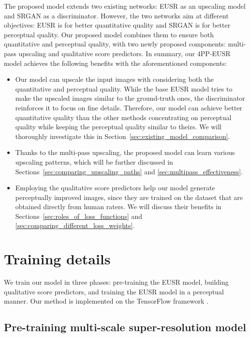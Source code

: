 \documentclass[runningheads]{llncs}
\begin{document}
The proposed model extends two existing networks: EUSR \cite{kim2018deep} as an upscaling model and SRGAN \cite{ledig2017photo} as a discriminator.
However, the two networks aim at different objectives: EUSR is for better quantitative quality and SRGAN is for better perceptual quality.
Our proposed model combines them to ensure both quantitative and perceptual quality, with two newly proposed components: multi-pass upscaling and qualitative score predictors.
In summary, our 4PP-EUSR model achieves the following benefits with the aforementioned components:
\begin{itemize}
	\item
	Our model can upscale the input images with considering both the quantitative and perceptual quality.
	While the base EUSR model tries to make the upscaled images similar to the ground-truth ones, the discriminator reinforces it to focus on fine details.
	Therefore, our model can achieve better quantitative quality than the other methods concentrating on perceptual quality while keeping the perceptual quality similar to theirs.
	We will thoroughly investigate this in Section~\ref{sec:existing_model_comparison}.\\
	
	\item
	Thanks to the multi-pass upscaling, the proposed model can learn various upscaling patterns, which will be further discussed in Sections~\ref{sec:comparing_upscaling_paths} and \ref{sec:multipass_effectiveness}.\\
	
	\item
	Employing the qualitative score predictors help our model generate perceptually improved images, since they are trained on the dataset that are obtained directly from human raters.
	We will discuss their benefits in Sections~\ref{sec:roles_of_loss_functions} and \ref{sec:comparing_different_loss_weights}.
\end{itemize}


\section{Training details}
\label{sec:training_details}

We train our model in three phases: pre-training the EUSR model, building qualitative score predictors, and training the EUSR model in a perceptual manner.
Our method is implemented on the TensorFlow framework \cite{abadi2016tensorflow}.


\subsection{Pre-training multi-scale super-resolution model}
\label{sec:pretraining_eusr}
\end{document}

